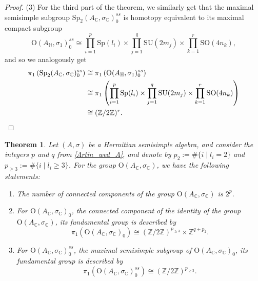 \documentclass[oneside,11pt]{amsart}
\newtheorem{thm}{Theorem}[section]
\theoremstyle{definition}
\theoremstyle{remark}
\numberwithin{thm}{section}
\numberwithin{equation}{section}
\begin{document}
\begin{proof}
(3) For the third part of the theorem, we similarly get that the maximal semisimple subgroup $\mathrm{Sp}_2(A_\mathbb{C}, \sigma_{\mathbb{C}})_0^{ss}$ is homotopy equivalent to its maximal compact subgroup \[\mathrm{O}(A_{\mathbb{H}}, \sigma_1)_0^{ss} \cong \prod_{i=1}^p \mathrm{Sp}(l_i) \times \prod_{j=1}^q \mathrm{SU}(2m_j) \times\prod_{k=1}^r \mathrm{SO}(4n_k),\]  
and so we analogously get 
\begin{align*}
\pi_1\left( \mathrm{Sp}_2(A_\mathbb{C}, \sigma_{\mathbb{C}})_0^{ss}\right) & \cong \pi_1\left(\mathrm{O}(A_{\mathbb{H}}, \sigma_1)_0^{ss}\right)\\
& \cong \pi_1\left( \prod_{i=1}^p \mathrm{Sp}(l_i) \times \prod_{j=1}^q \mathrm{SU}(2m_j) \times\prod_{k=1}^r \mathrm{SO}(4n_k)\right)\\
& \cong (\mathbb{Z}/2\mathbb{Z})^r. \qedhere
\end{align*}
\end{proof}

\begin{thm}\label{prop:max_semisimple_simply_con_O}
Let $(A, \sigma)$ be a Hermitian semisimple algebra, and consider the integers $p$ and $q$ from \eqref{Artin_wed_A}, and denote by $p_2:=\#\{ i\mid l_i=2\}$ and $p_{\geq3}:=\#\{i\mid l_i\geq3\}$. For the group $\mathrm{O}(A_\mathbb{C}, \sigma_{\mathbb{C}})$, we have the following statements: 
\begin{enumerate}
\item The number of connected components of the group $\mathrm{O}(A_\mathbb{C}, \sigma_{\mathbb{C}})$ is $2^p$.
\item For $\mathrm{O}(A_\mathbb{C}, \sigma_{\mathbb{C}})_0$, the connected component of the identity of the group $\mathrm{O}(A_\mathbb{C}, \sigma_{\mathbb{C}})$, its fundamental group is described by
\[\pi_1\left(\mathrm{O}(A_\mathbb{C}, \sigma_{\mathbb{C}})_0\right)\cong (\mathbb{Z}/2\mathbb{Z})^{p_{\geq3}}\times \mathbb{Z}^{q+p_2}.\] 
\item For $\mathrm{O}(A_\mathbb{C}, \sigma_{\mathbb{C}})_0^{ss}$, the maximal semisimple subgroup of $\mathrm{O}(A_\mathbb{C}, \sigma_{\mathbb{C}})_0$, its fundamental group is described by
\[\pi_1\left(\mathrm{O}(A_\mathbb{C}, \sigma_{\mathbb{C}})_0^{ss}\right)\cong  (\mathbb{Z}/2\mathbb{Z})^{p_{\geq3}}.\]
\end{enumerate}
\end{thm}
\end{document}
